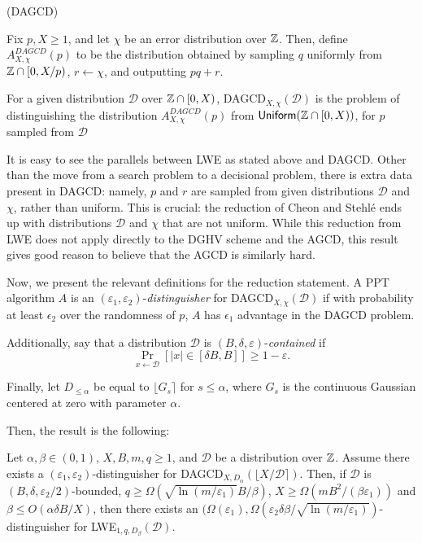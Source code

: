         \begin{definition} (DAGCD)

            Fix $p, X \geq 1$, and let $\chi$ be an error distribution over $\mathbb{Z}$. Then, define $A^{DAGCD}_{X, \chi}(p)$ to be the distribution obtained by sampling $q$ uniformly from $\mathbb{Z} \cap [0, X / p)$, $r \leftarrow \chi$, and outputting $pq + r$.

            For a given distribution $\mathcal{D}$ over $\mathbb{Z} \cap [0, X)$, DAGCD$_{X, \chi}(\mathcal{D})$ is the problem of distinguishing the distribution $A^{DAGCD}_{X, \chi}(p)$ from ${\sf Uniform}(\mathbb{Z} \cap [0, X))$, for $p$ sampled from $\mathcal{D}$
        \end{definition}

        It is easy to see the parallels between LWE as stated above and DAGCD. Other than the move from a search problem to a decisional problem, there is extra data present in DAGCD: namely, $p$ and $r$ are sampled from given distributions $\mathcal{D}$ and $\chi$, rather than uniform. This is crucial: the reduction of Cheon and Stehl\'e ends up with distributions $\mathcal{D}$ and $\chi$ that are not uniform. While this reduction from LWE does not apply directly to the DGHV scheme and the AGCD, this result gives good reason to believe that the AGCD is similarly hard.

        Now, we present the relevant definitions for the reduction statement. A PPT algorithm $A$ is an $(\varepsilon_1, \varepsilon_2)$-\emph{distinguisher} for DAGCD$_{X, \chi}(\mathcal{D})$ if with probability at least $\epsilon_2$ over the randomness of $p$, $A$ has $\epsilon_1$ advantage in the DAGCD problem.

        Additionally, say that a distribution $\mathcal{D}$ is $(B, \delta, \varepsilon)$-\emph{contained} if
        \[\Pr_{x \leftarrow \mathcal{D}}[|x| \in [\delta B, B]] \geq 1 - \varepsilon.\]

        Finally, let $D_{\leq \alpha}$ be equal to $\lfloor G_s \rceil$ for $s \leq \alpha$, where $G_s$ is the continuous Gaussian centered at zero with parameter $\alpha$.

        Then, the result is the following:
        \begin{theorem}
            Let $\alpha, \beta \in (0, 1)$, $X, B, m, q \geq 1$, and $\mathcal{D}$ be a distribution over $\mathbb{Z}$. Assume there exists a $(\varepsilon_1, \varepsilon_2)$-distinguisher for DAGCD$_{X, D_\alpha}(\lfloor X / \mathcal{D} \rceil)$. Then, if $\mathcal{D}$ is $(B, \delta, \varepsilon_2 / 2)$-bounded, $q \geq \Omega(\sqrt{\ln(m / \varepsilon_1)} B / \beta)$, $X \geq \Omega(m B^2 / (\beta \varepsilon_1))$ and $\beta \leq O(\alpha \delta B / X)$, then there exists an $(\Omega(\varepsilon_1), \Omega(\varepsilon_2 \delta \beta / \sqrt{\ln(m / \varepsilon_1)})$-distinguisher for LWE$_{1, q, D_\beta}(\mathcal{D})$.
        \end{theorem}

